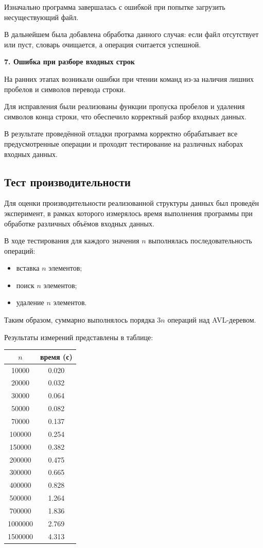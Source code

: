 \documentclass[12pt]{article}
\begin{document}
Изначально программа завершалась с ошибкой при попытке загрузить несуществующий файл.

В дальнейшем была добавлена обработка данного случая: если файл отсутствует или пуст, словарь очищается, а операция считается успешной.

\vspace{1\baselineskip}
\textbf{7. Ошибка при разборе входных строк}
\vspace{1\baselineskip}

На ранних этапах возникали ошибки при чтении команд из-за наличия лишних пробелов и символов перевода строки.

Для исправления были реализованы функции пропуска пробелов и удаления символов конца строки, что обеспечило корректный разбор входных данных.

В результате проведённой отладки программа корректно обрабатывает все предусмотренные операции и проходит тестирование на различных наборах входных данных.

\subsection*{Тест производительности}

Для оценки производительности реализованной структуры данных был проведён эксперимент, в рамках которого измерялось время выполнения программы при обработке различных объёмов входных данных.

В ходе тестирования для каждого значения $n$ выполнялась последовательность операций:
\begin{itemize}
	\item вставка $n$ элементов;
	\item поиск $n$ элементов;
	\item удаление $n$ элементов.
\end{itemize}

Таким образом, суммарно выполнялось порядка $3n$ операций над AVL-деревом.

Результаты измерений представлены в таблице:

\begin{center}
	\begin{tabular}{|c|c|}
		\hline
		$n$ & время (с) \\
		\hline
		10000 & 0.020 \\
		20000 & 0.032 \\
		30000 & 0.064 \\
		50000 & 0.082 \\
		70000 & 0.137 \\
		100000 & 0.254 \\
		150000 & 0.382 \\
		200000 & 0.475 \\
		300000 & 0.665 \\
		400000 & 0.828 \\
		500000 & 1.264 \\
		700000 & 1.836 \\
		1000000 & 2.769 \\
		1500000 & 4.313 \\
		\hline
	\end{tabular}
\end{center}
\end{document}
